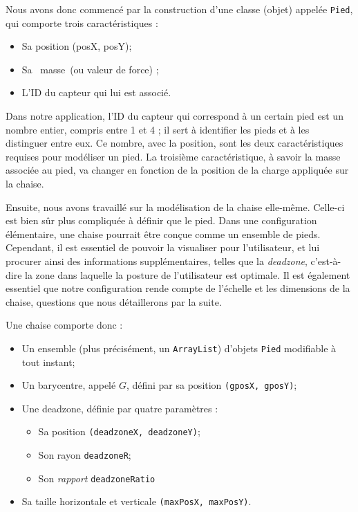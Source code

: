 \documentclass{polytech/polytech}
\begin{document}
Nous avons donc commencé par la construction d'une classe (objet) appelée \texttt{Pied}, qui comporte trois caractéristiques :
\begin{itemize}
\item Sa position (posX, posY);
\item Sa \guillemotleft ~masse~\guillemotright (ou valeur de force) ;
\item L’ID du capteur qui lui est associé.
\end{itemize}

Dans notre application, l'ID du capteur qui correspond à un certain pied est un nombre entier, compris entre 1 et 4 ; il sert à identifier les pieds et à les distinguer entre eux. Ce nombre, avec la position, sont les deux caractéristiques requises pour modéliser un pied. La troisième caractéristique, à savoir la masse associée au pied, va changer en fonction de la position de la charge appliquée sur la chaise.

Ensuite, nous avons travaillé sur la modélisation de la chaise elle-même. 
Celle-ci est bien sûr plus compliquée à définir que le pied. 
Dans une configuration élémentaire, une chaise pourrait être conçue comme un ensemble de pieds.
Cependant, il est essentiel de pouvoir la visualiser pour l'utilisateur, et lui procurer ainsi des informations supplémentaires, telles que la \textit{deadzone}, c'est-à-dire la zone dans laquelle la posture de l'utilisateur est optimale.
Il est également essentiel que notre configuration rende compte de l'échelle et les dimensions de la chaise, questions que nous détaillerons par la suite.

Une chaise comporte donc :
\begin{itemize}
\item Un ensemble (plus précisément, un \texttt{ArrayList}) d'objets \texttt{Pied} modifiable à tout instant;
\item Un barycentre, appelé $G$, défini par sa position \texttt{(gposX, gposY)};
\item Une deadzone, définie par quatre paramètres :
\begin{itemize}
\item Sa position \texttt{(deadzoneX, deadzoneY)};
\item Son rayon \texttt{deadzoneR};
\item Son \textit{rapport} \texttt{deadzoneRatio}
\end{itemize}
\item Sa taille horizontale et verticale \texttt{(maxPosX, maxPosY)}.
\end{itemize}
\end{document}
